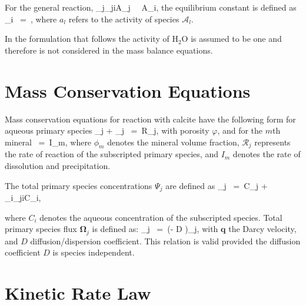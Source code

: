 \documentclass[12pt]{article}
\def\EQ#1\EN{\begin{equation}#1\end{equation}}
\def\BA#1\EA{\begin{align}#1\end{align}}
\newcommand{\eq}{\ =\ }
\newcommand{\p}{{\partial}}
\newcommand{\A}{{\mathcal A}}
\newcommand{\R}{{{\mathcal R}}}
\newcommand{\bnabla}{\boldsymbol{\nabla}}
\newcommand{\bOmega}{\boldsymbol{\Omega}}
\newcommand{\bq}{\boldsymbol{q}}
\newcommand{\arrows}{~\rightleftharpoons~}
\begin{document}
\noindent
For the general reaction, 
\EQ
\sum_j\nu_{ji}\A_j \arrows \A_i,
\EN
the equilibrium constant is defined as
\EQ
K_i \eq {},
\EN
where $a_l$ refers to the activity of species $\A_l$.

\noindent
In the formulation that follows the activity of H$_2$O is assumed to be one and therefore is not considered in the mass balance equations.

\section{Mass Conservation Equations}

Mass conservation equations for reaction with calcite have the following form for aqueous primary species
\EQ
\frac{\p}{\p t} \varphi\Psi_j + \bnabla\cdot\bOmega_j \eq \R_j,
\EN
with porosity $\varphi$, and for the $m$th mineral
\EQ
\frac{\p\phi_{m}}{\p t} \eq I_{m},
\EN
where $\phi_{m}$ denotes the mineral volume fraction, $\R_j$ represents the rate of reaction of the subscripted primary species, and $I_{m}$ denotes the rate of dissolution and precipitation.

The total primary species concentrations $\Psi_j$ are defined as
\EQ
\Psi_j \eq C_j + \sum_i\nu_{ji}C_i,
\EN

\begin{comment}
\begin{subequations}
\BA
\Psi_{\rm Ca^{2+}} &\eq C_{\rm Ca^{2+}} + C_{\rm CaCO_{3(aq)}} + C_{\rm CaHCO_3^-},\\
\Psi_{\rm HCO_3^-} &\eq C_{\rm HCO_3^-} + C_{\rm CO_3^{2-}} + C_{\rm CO_{2(aq)}} + C_{\rm CaCO_{3(aq)}} + C_{\rm CaHCO_3^-} ,\\
\Psi_{\rm H^+} &\eq C_{\rm H^+} - C_{\rm OH^-}
\EA
\end{subequations}
\end{comment}

\noindent
where $C_i$ denotes the aqueous concentration of the subscripted species.
Total primary species flux $\bOmega_j$ is defined as:
\EQ
\bOmega_j \eq \big(\bq - \varphi D \bnabla\big)\Psi_j,
\EN
with $\bq$ the Darcy velocity, and $D$ diffusion/dispersion coefficient. This relation is valid provided the diffusion coefficient $D$ is species independent.

\section{Kinetic Rate Law}
\end{document}
